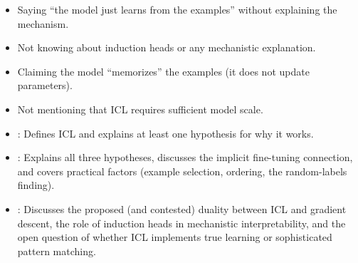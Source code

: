 \begin{interviewq}
\redflags
\begin{itemize}
\item Saying ``the model just learns from the examples'' without explaining
  the mechanism.
\item Not knowing about induction heads or any mechanistic explanation.
\item Claiming the model ``memorizes'' the examples (it does not update
  parameters).
\item Not mentioning that ICL requires sufficient model scale.
\end{itemize}


\goodgreat
\begin{itemize}
\item {}: Defines ICL and explains at least one hypothesis
  for why it works.
\item {}: Explains all three hypotheses, discusses the
  implicit fine-tuning connection, and covers practical factors (example
  selection, ordering, the random-labels finding).
\item {}: Discusses the proposed (and contested) duality
  between ICL and gradient descent, the role of induction heads in
  mechanistic interpretability, and the open question of whether ICL
  implements true learning or sophisticated pattern matching.
\end{itemize}

\end{interviewq}


